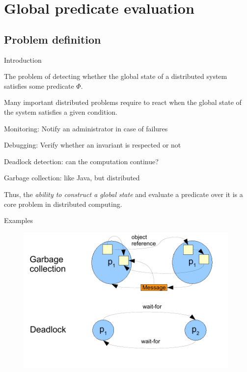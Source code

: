 \section{Global predicate evaluation}

\subsection{Problem definition}

\begin{frame}{Introduction}

\begin{definition}
The problem of detecting whether the global state of a distributed system satisfies
some predicate $\Phi$.
\end{definition}

\bigskip
{}
\BIL
\item Many important distributed problems require to react when the global
  state of the system satisfies a given condition.
  \BI
  \item \alert{Monitoring}: Notify an administrator in
    case of failures
  \item \alert{Debugging}: Verify whether an invariant 
    is respected or not
  \item \alert{Deadlock detection}: can the computation continue?
  \item \alert{Garbage collection}: like Java, but distributed
  \EI
\item Thus, the \emph{ability to construct a global state} and 
  evaluate a predicate over it is a core
  problem in distributed computing.
\EIL
\end{frame}

\begin{frame}{Examples}

\begin{figure} 
\includegraphics[width=11cm]{figs/03/gpe}
\end{figure}

\end{frame}


